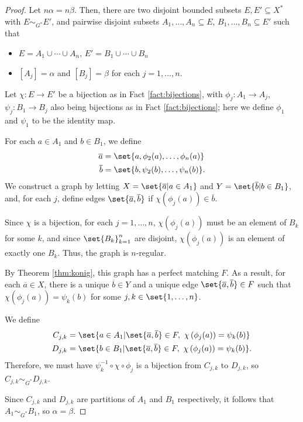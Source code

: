 \documentclass[10pt]{mypackage2}
\begin{document}
\begin{proof}
  Let $n\alpha = n\beta$. Then, there are two disjoint bounded subsets $E,E'\subseteq X^{\ast}$ with $E\sim_{G^{\ast}}E'$, and pairwise disjoint subsets $A_1,\dots,A_n\subseteq E$, $B_1,\dots,B_n\subseteq E'$ such that
  \begin{itemize}
    \item $E = A_1\cup\cdots\cup A_n$, $E' = B_1\cup\cdots\cup B_n$
    \item $\left[ A_j \right] = \alpha$ and $\left[B_j\right] = \beta$ for each $j=1,\dots,n$.
  \end{itemize}
  Let $\chi\colon E\rightarrow E'$ be a bijection as in Fact \ref{fact:bijections}, with $\phi_j\colon A_1\rightarrow A_j$, $\psi_j\colon B_1\rightarrow B_j$ also being bijections as in Fact \ref{fact:bijections}; here we define $\phi_1$ and $\psi_1$ to be the identity map.\newline

  For each $a\in A_1$ and $b\in B_1$, we define
  \begin{align*}
    \overline{a} &= \set{a,\phi_2(a),\dots,\phi_n(a)}\\
    \overline{b} &= \set{b,\psi_2(b),\dots,\psi_n(b)}.
  \end{align*}
  We construct a graph by letting $X = \set{\overline{a}| a\in A_1}$ and $Y = \set{\overline{b}| b\in B_1}$, and, for each $j$, define edges $\set{\overline{a},\overline{b}}$ if $\chi\left(\phi_j(a)\right)\in \overline{b}$.\newline

  Since $\chi$ is a bijection, for each $j=1,\dots,n$, $\chi\left(\phi_j(a)\right)$ must be an element of $B_k$ for some $k$, and since $\set{B_k}_{k=1}^{n}$ are disjoint, $\chi\left(\phi_j(a)\right)$ is an element of exactly one $B_k$. Thus, the graph is $n$-regular.\newline

  By Theorem \ref{thm:konig}, this graph has a perfect matching $F$. As a result, for each $\overline{a}\in X$, there is a unique $\overline{b}\in Y$ and a unique edge $\set{\overline{a},\overline{b}}\in F$ such that $\chi\left(\phi_j(a)\right) = \psi_k(b)$ for some $j,k\in \set{1,\dots,n}$.\newline

  We define
  \begin{align*}
    C_{j,k} &= \set{a\in A_1| \set{\overline{a},\overline{b}}\in F,~\chi\left(\phi_j(a)\right) = \psi_k(b)}\\
    D_{j,k} &= \set{b\in B_1| \set{\overline{a},\overline{b}}\in F,~\chi\left(\phi_j(a)\right) = \psi_k(b)}.
  \end{align*}
  Therefore, we must have $\psi_{k}^{-1}\circ \chi\circ \phi_j$ is a bijection from $C_{j,k}$ to $D_{j,k}$, so $C_{j,k}\sim_{G^{\ast}}D_{j,k}$.\newline

  Since $C_{j,k}$ and $D_{j,k}$ are partitions of $A_1$ and $B_1$ respectively, it follows that $A_1\sim_{G^{\ast}}B_1$, so $\alpha = \beta$.
\end{proof}
\end{document}

